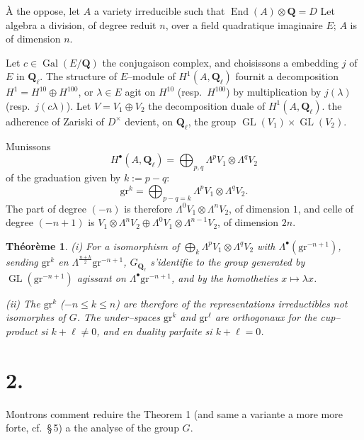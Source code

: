 \documentclass[11pt,a4paper]{article}
\theoremstyle{plain}
\newtheorem{theorem}{Th\'eor\`eme}
\theoremstyle{definition}
\DeclareMathOperator{\Gal}{Gal}
\DeclareMathOperator{\End}{End}
\DeclareMathOperator{\GL}{GL}
\begin{document}
\`A the oppose, let $A$ a variety irreducible such that $\End(A) \otimes \mathbf{Q} = D$ Let algebra a division, of degree reduit $n$, over a field quadratique imaginaire $E$; $A$ is of dimension $n$.

Let $c \in \Gal(E/\mathbf{Q})$ the conjugaison complex, and choisissons a embedding $j$ of $E$ in $\mathbf{Q}_\ell$. The structure of $E$--module of $H^1(A, \mathbf{Q}_\ell)$ fournit a decomposition $H^1 = H^{10} \oplus H^{100}$, or $\lambda \in E$ agit on $H^{10}$ (resp.\ $H^{100}$) by multiplication by $j(\lambda)$ (resp.\ $j(c\lambda)$). Let $V = V_1 \oplus V_2$ the decomposition duale of $H^1(A, \mathbf{Q}_\ell)$. the adherence of Zariski of $D^\times$ devient, on $\mathbf{Q}_\ell$, the group $\GL(V_1) \times \GL(V_2)$.

Munissons
\[
H^\bullet(A, \mathbf{Q}_\ell) = \bigoplus_{p,q} \Lambda^p V_1 \otimes \Lambda^q V_2
\]
of the graduation given by $k := p - q$:
\begin{equation}\label{eq:grad}
\mathrm{gr}^k = \bigoplus_{p-q=k} \Lambda^p V_1 \otimes \Lambda^q V_2 .
\end{equation}
The part of degree $(-n)$ is therefore $\Lambda^0 V_1 \otimes \Lambda^n V_2$, of dimension $1$, and celle of degree $(-n+1)$ is $V_1 \otimes \Lambda^n V_2 \oplus \Lambda^0 V_1 \otimes \Lambda^{n-1} V_2$, of dimension $2n$.

\begin{theorem}\label{thm:3}
\emph{(i)} For a isomorphism of $\bigoplus_k \Lambda^p V_1 \otimes \Lambda^q V_2$ with $\Lambda^\bullet(\mathrm{gr}^{-n+1})$, sending $\mathrm{gr}^k$ en $\Lambda^{\frac{n+k}{2}} \mathrm{gr}^{-n+1}$, $G_{\mathbf{Q}_\ell}$ s'identifie to the group generated by $\GL(\mathrm{gr}^{-n+1})$ agissant on $\Lambda^\bullet \mathrm{gr}^{-n+1}$, and by the homotheties $x \mapsto \lambda x$.

\emph{(ii)} The $\mathrm{gr}^k$ ($-n \leq k \leq n$) are therefore of the representations irreductibles not isomorphes of $G$. The under--spaces $\mathrm{gr}^k$ and $\mathrm{gr}^\ell$ are orthogonaux for the cup--product si $k + \ell \neq 0$, and en duality parfaite si $k + \ell = 0$.
\end{theorem}

\section*{2.}

Montrons comment reduire the Theorem 1 (and same a variante a more more forte, cf.\ \S\,5) a the analyse of the group $G$.
\end{document}
